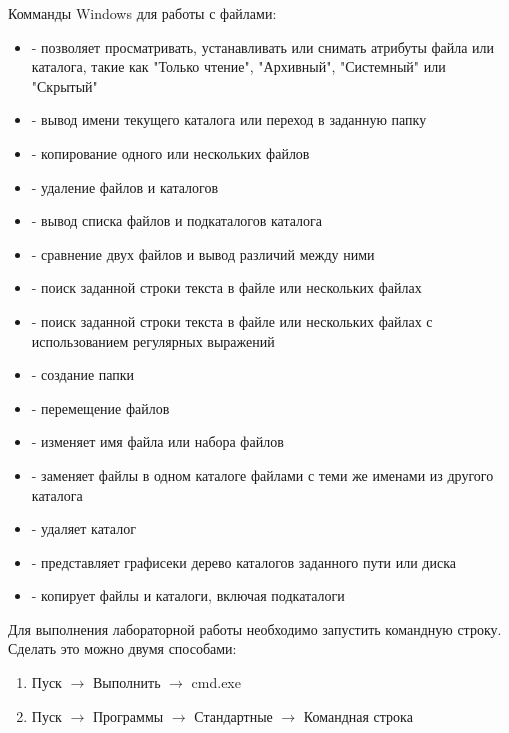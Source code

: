 \documentclass[a4paper,12pt]{article}
\begin{document}
  
    \begin{flushleft}
        Комманды Windows для работы с файлами:
        \begin{itemize}
            \item {} - позволяет просматривать, устанавливать или снимать атрибуты файла или каталога, такие как "Только чтение", "Архивный", "Системный" или "Скрытый"
            \item {} - вывод имени текущего каталога или переход в заданную папку
            \item {} - копирование одного или нескольких файлов
            \item {} - удаление файлов и каталогов
            \item {} - вывод списка файлов и подкаталогов каталога
            \item {} - сравнение двух файлов и вывод различий между ними
            \item {} - поиск заданной строки текста в файле или нескольких файлах
            \item {} - поиск заданной строки текста в файле или нескольких файлах с использованием регулярных выражений
            \item {} - создание папки
            \item {} - перемещение файлов
            \item {} - изменяет имя файла или набора файлов
            \item {} - заменяет файлы в одном каталоге файлами с теми же именами из другого каталога
            \item {} - удаляет каталог
            \item {} - представляет графисеки дерево каталогов заданного пути или диска
            \item {} - копирует файлы и каталоги, включая подкаталоги
        \end{itemize}
    \end{flushleft}
  
    \begin{flushleft}
        Для выполнения лабораторной работы необходимо запустить командную строку. Сделать это можно двумя способами:
        \begin{enumerate}
            \item Пуск $\to$ Выполнить $\to$ cmd.exe
            \item Пуск $\to$ Программы $\to$ Стандартные $\to$ Командная строка
        \end{enumerate}
    \end{flushleft}
  
\end{document}
